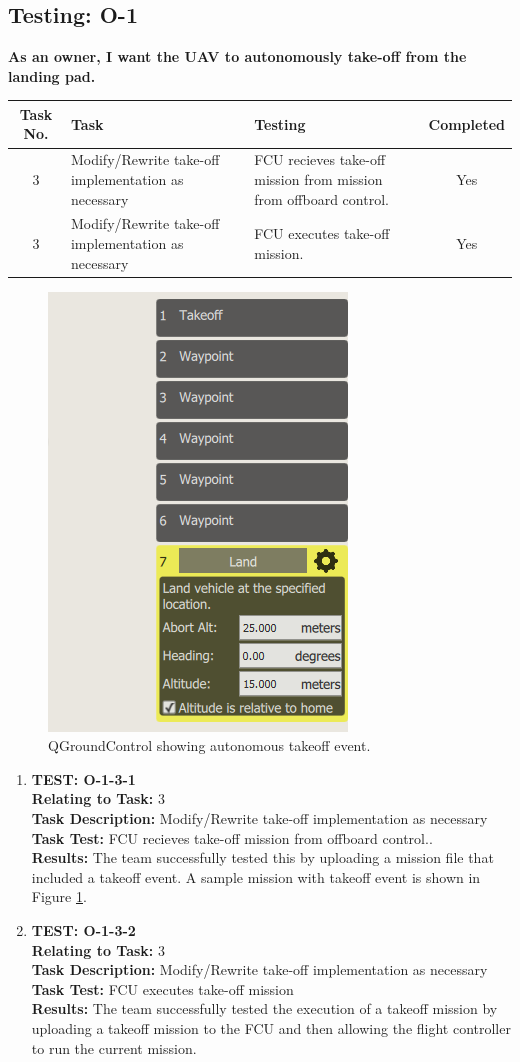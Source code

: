 \newpage
\subsection{Testing: O-1}
\textbf{As an owner, I want the UAV to autonomously take-off from the landing pad.}\\
\begin{tabular}{| c | >{\raggedright}m{4cm} | m{4cm} | c |}\hline
	Task No. & Task & Testing & Completed\\\hline
	3 & Modify/Rewrite take-off implementation as necessary
 & FCU recieves take-off mission from mission from offboard control. & Yes\\\hline	
	3 & Modify/Rewrite take-off implementation as necessary
 & FCU executes take-off mission. & Yes\\\hline	
\end{tabular}

\begin{figure}[H]
\centering
\includegraphics[height=0.5\textwidth]{images/events.PNG}
\caption{QGroundControl showing autonomous takeoff event.}
\label{fig:mission}
\end{figure}

\begin{enumerate}
\item \textbf{TEST: O-1-3-1}\\
\textbf{Relating to Task:} 3\\
\textbf{Task Description:} Modify/Rewrite take-off implementation as necessary \\
\textbf{Task Test:} FCU recieves take-off mission from offboard control..\\
\textbf{Results:} The team successfully tested this by uploading a mission file that included a takeoff event. A sample mission with takeoff event is shown in Figure \ref{fig:mission}.

\item \textbf{TEST: O-1-3-2}\\
\textbf{Relating to Task:} 3\\
\textbf{Task Description:} Modify/Rewrite take-off implementation as necessary\\
\textbf{Task Test:} FCU executes take-off mission\\
\textbf{Results:} The team successfully tested the execution of a takeoff mission by uploading a takeoff mission to the FCU and then allowing the flight controller to run the current mission. 
\end{enumerate}


